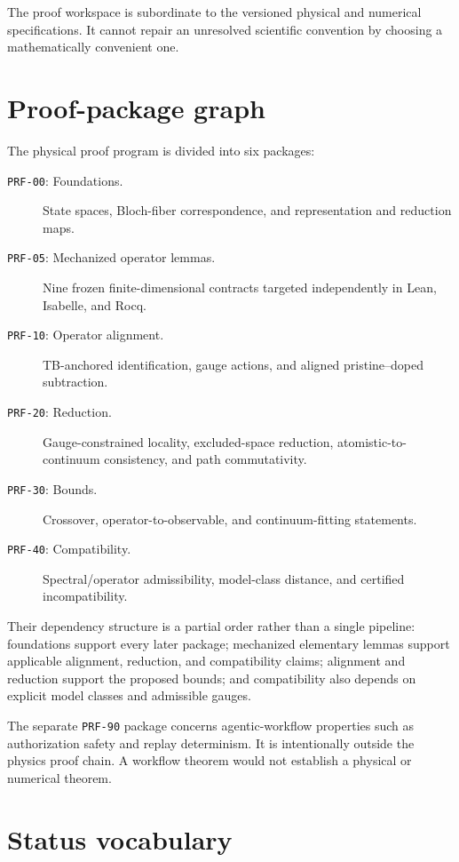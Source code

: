 The proof workspace is subordinate to the versioned physical and numerical
specifications. It cannot repair an unresolved scientific convention by
choosing a mathematically convenient one.

\section{Proof-package graph}

The physical proof program is divided into six packages:

\begin{description}
  \item[\texttt{PRF-00}: Foundations.] State spaces, Bloch-fiber
    correspondence, and representation and reduction maps.
  \item[\texttt{PRF-05}: Mechanized operator lemmas.] Nine frozen
    finite-dimensional contracts targeted independently in Lean, Isabelle, and
    Rocq.
  \item[\texttt{PRF-10}: Operator alignment.] TB-anchored identification,
    gauge actions, and aligned pristine--doped subtraction.
  \item[\texttt{PRF-20}: Reduction.] Gauge-constrained locality,
    excluded-space reduction, atomistic-to-continuum consistency, and path
    commutativity.
  \item[\texttt{PRF-30}: Bounds.] Crossover, operator-to-observable, and
    continuum-fitting statements.
  \item[\texttt{PRF-40}: Compatibility.] Spectral/operator admissibility,
    model-class distance, and certified incompatibility.
\end{description}

Their dependency structure is a partial order rather than a single pipeline:
foundations support every later package; mechanized elementary lemmas support
applicable alignment, reduction, and compatibility claims; alignment and
reduction support the proposed bounds; and compatibility also depends on
explicit model classes and admissible gauges.

The separate \texttt{PRF-90} package concerns agentic-workflow properties such
as authorization safety and replay determinism. It is intentionally outside the
physics proof chain. A workflow theorem would not establish a physical or
numerical theorem.

\section{Status vocabulary}


